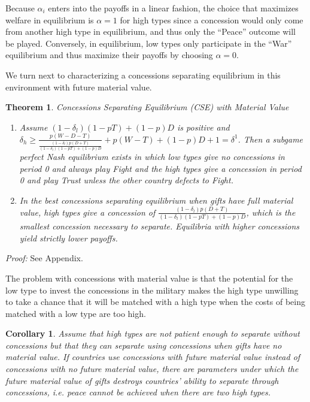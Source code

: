 \documentclass[12pt, letterpaper]{article}
\newcommand{\de}{\delta}
\newcommand{\al}{\alpha}
\newtheorem{theorem}{Theorem}
\newtheorem{corollary}{Corollary}
\begin{document}
Because $\al_i$ enters into the payoffs in a linear fashion, the choice that maximizes welfare in equilibrium is $\alpha=1$ for high types since a concession would only come from another high type in equilibrium, and thus only the ``Peace'' outcome will be played. Conversely, in equilibrium, low types only participate in the ``War'' equilibrium and thus maximize their payoffs by choosing $\alpha=0$. 

We turn next to characterizing a concessions separating equilibrium in this environment with future material value.

\begin{theorem}
\emph{Concessions Separating Equilibrium (CSE) with Material Value}
	\begin{enumerate}
		\item[(a)] Assume $\left(1-\de_l\right)\left(1 - pT \right) + (1-p) D$ is positive and $\de_h \geq \frac{p(W-D-T)}{\frac{\left(1-\de_l\right)p\left(D +	 T\right)}{\left(1-\de_l\right)\left(1 - pT \right) + (1-p) D}} + p (W-T) + (1-p)D + 1 = \de^{1}$. Then a subgame perfect Nash equilibrium exists in which low types give no concessions in period 0 and always play Fight and the high types give a concession in period 0 and play Trust unless the other country defects to Fight.
		\item[(b)] In the best concessions separating equilibrium when gifts have full material value, high types give a concession of $\frac{\left(1-\de_l\right)p\left(D + T\right)}{\left(1-\de_l\right)\left(1 - pT \right) + (1-p) D}$, which is the smallest concession necessary to separate. Equilibria with higher concessions yield strictly lower payoffs.
\end{enumerate}
	\label{theorem:csemv}
\end{theorem}
\emph{Proof:} See Appendix.

The problem with concessions with material value is that the potential for the low type to invest the concessions in the military makes the high type unwilling to take a chance that it will be matched with a high type when the costs of being matched with a low type are too high.

\begin{corollary}
	Assume that high types are not patient enough to separate without concessions but that they can separate using concessions when gifts have no material value. If countries use concessions with future material value instead of concessions with no future material value, there are parameters under which the future material value of gifts destroys countries' ability to separate through concessions, i.e. peace cannot be achieved when there are two high types.
	\label{corollary:matval}
\end{corollary}
\end{document}
